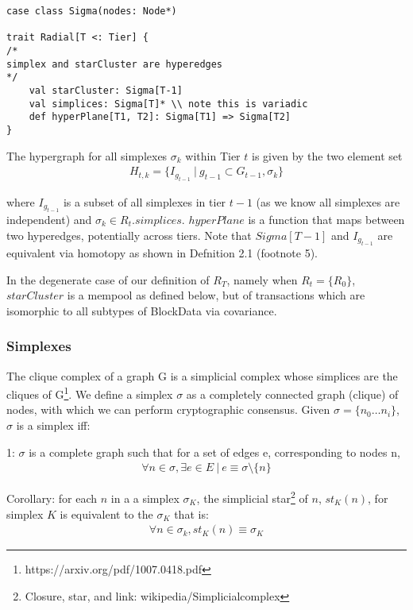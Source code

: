 \documentclass{article}
\begin{document}
\begin{lstlisting}
case class Sigma(nodes: Node*)

trait Radial[T <: Tier] {
/*
simplex and starCluster are hyperedges
*/
	val starCluster: Sigma[T-1]
	val simplices: Sigma[T]* \\ note this is variadic
	def hyperPlane[T1, T2]: Sigma[T1] => Sigma[T2]
}
\end{lstlisting}

The hypergraph for all simplexes $\sigma_k$ within Tier $t$ is given by the two element set
\begin{equation} \label{eq1}
\begin{split}
H_{t,k} = \{I_{g_{t-1}} \ | \ g_{t-1} \subset G_{t-1}, \sigma_k \}
\end{split}
\end{equation}

where $I_{g_{t-1}}$ is a subset of all simplexes in tier $t-1$ (as we know all simplexes are independent) and $\sigma_k \in R_t.simplices$. $hyperPlane$ is a function that maps between two hyperedges, potentially across tiers. Note that $Sigma[T-1]$ and $I_{g_{t-1}}$ are equivalent via homotopy as shown in Defnition 2.1 (footnote 5). 

In the degenerate case of our definition of $R_T$, namely when $R_t = \{R_0\}$, $starCluster$ is a mempool as defined below, but of transactions which are isomorphic to all subtypes of BlockData via covariance.


\subsubsection{Simplexes}
The clique complex of a graph G is a simplicial complex whose simplices are the cliques of G\footnote{https://arxiv.org/pdf/1007.0418.pdf}. We define a simplex $\sigma$ as a completely connected graph (clique) of nodes, with which we can perform cryptographic consensus. Given $\sigma = \{n_0 \dots n_i\}$, $\sigma$ is a simplex iff:

1: $\sigma$ is a complete graph such that for a set of edges e, corresponding to nodes n,
\begin{equation} \label{eq1}
\begin{split}
\forall n \in \sigma, \exists e \in E \ | \ e \equiv \sigma \setminus \{n\} 
\end{split}
\end{equation}

Corollary: for each $n$ in a a simplex $\sigma_K$, the simplicial star\footnote{Closure, star, and link: wikipedia/Simplicialcomplex} of $n$, $st_K(n)$, for simplex $K$ is equivalent to the $\sigma_K$ that is:
\begin{equation} \label{eq1}
\begin{split}
\forall n \in \sigma_k, st_K(n) \equiv \sigma_K
\end{split}
\end{equation}
\end{document}
